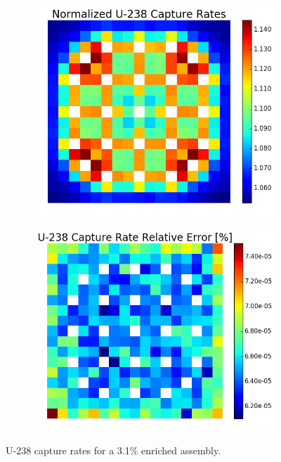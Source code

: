 \begin{figure}[h!]
\centering
\begin{subfigure}{0.5\textwidth}
  \centering
  \includegraphics[width=\linewidth]{figures/benchmarks/capture-rates/capt-mean-fuel-31}
  \caption{}
  \label{fig:chap7-capt-rate-mean-3.1-assm}
\end{subfigure}%
\begin{subfigure}{0.5\textwidth}
  \centering
  \includegraphics[width=\linewidth]{figures/benchmarks/capture-rates/capt-rel-err-fuel-31}
  \caption{}
  \label{fig:chap7-capt-rate-rel-err-3.1-assm}
\end{subfigure}%
\caption[U-238 capture rates for a 3.1\% enriched assembly]{U-238 capture rates for a 3.1\% enriched assembly.}
\label{fig:chap7-capt-rates-3.1-assm}
\end{figure}

